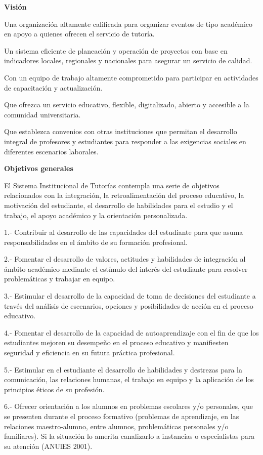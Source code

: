 \bigskip
\textbf{Visión}

Una organización altamente calificada para organizar eventos de tipo académico en apoyo a quienes ofrecen el servicio de tutoría.

Un sistema eficiente de   planeación y operación de proyectos con base en indicadores locales, regionales y nacionales para asegurar un servicio de calidad.

Con un equipo de trabajo altamente comprometido para participar en actividades de capacitación y actualización.

Que ofrezca un servicio educativo, flexible, digitalizado, abierto y accesible a la comunidad universitaria.

Que establezca convenios con otras instituciones que permitan el de\-sa\-rro\-llo integral de profesores  y estudiantes para responder  a las exigencias  sociales  en diferentes  escenarios  laborales.

\bigskip
\textbf{Objetivos generales}

El Sistema  Institucional  de Tutorías  contempla  una serie de objetivos   relacionados con  la integración,   la  retroalimentación   del  proceso  educativo,   la  motivación   del estudiante,   el  desarrollo   de  habilidades   para  el  estudio   y  el  trabajo,   el  apoyo académico  y la orientación   personalizada.

\begin{Obs}
\item[1.-] Contribuir   al  desarrollo   de  las  capacidades   del  estudiante   para  que  asuma responsabilidades   en el ámbito de su formación  profesional.
\item[2.-]   Fomentar  el  desarrollo   de  valores,  actitudes  y habilidades   de  integración   al ámbito  académico mediante el estímulo  del interés del estudiante   para  resolver problemáticas y  trabajar en equipo.
\newpage

\item[3.-]  Estimular  el desarrollo  de la capacidad de toma  de decisiones   del estudiante  a través del análisis  de escenarios,  opciones y posibilidades  de acción  en el proceso educativo.
\item[4.-]  Fomentar  el desarrollo  de la capacidad  de autoaprendizaje   con el fin de que los estudiantes mejoren su desempeño  en   el   proceso   educativo    y   manifiesten seguridad  y eficiencia  en su futura  práctica profesional.
\item[5.-]   Estimular en  el estudiante el  desarrollo   de  habilidades   y destrezas   para  la comunicación,   las relaciones  humanas,  el trabajo  en equipo  y la aplicación  de los principios  éticos de su profesión.
\item[6.-]  Ofrecer  orientación a los alumnos  en problemas  escolares  y\slash{}o personales,  que se  presenten   durante   el  proceso  formativo   (problemas   de  aprendizaje, en  las relaciones  maestro-alumno, entre alumnos,  problemáticas   personales y\slash{}o familiares). Si la situación lo amerita canalizarlo a instancias o especialistas para su atención (ANUlES 2001).
\end{Obs}

